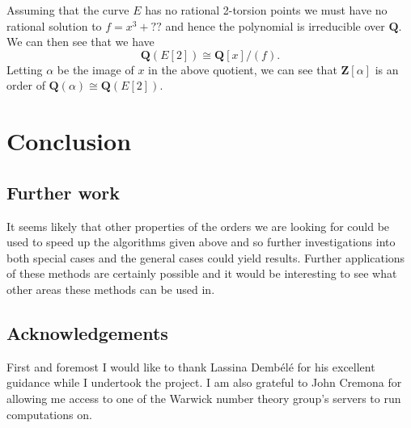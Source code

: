 \documentclass[a4paper,abstracton,bibtotoc]{scrreprt}
\theoremstyle{definition}
\newcommand{\QQ}{\mathbf{Q}}
\newcommand{\ZZ}{\mathbf{Z}}
\begin{document}
\minisec{}
Assuming that the curve $E$ has no rational 2-torsion points we must have no rational solution to $f = x^3 + ??$ and hence the polynomial is irreducible over $\QQ$.
We can then see that we have
\[
\QQ(E[2]) \cong \QQ[x]/(f).
\]
Letting $\alpha$ be the image of $x$ in the above quotient, we can see that $ \ZZ[\alpha]$ is an order of $\QQ(\alpha)\cong \QQ(E[2])$.


\chapter{Conclusion}

\section{Further work}
It seems likely that other properties of the orders we are looking for could be used to speed up the algorithms given above and so further investigations into both special cases and the general cases could yield results.
Further applications of these methods are certainly possible and it would be interesting to see what other areas these methods can be used in.


\section{Acknowledgements}
First and foremost I would like to thank Lassina Demb\'el\'e for his excellent guidance while I undertook the project.
I am also grateful to John Cremona for allowing me access to one of the Warwick number theory group's servers to run computations on.


 
%

%

\nocite{*}


\end{document}
